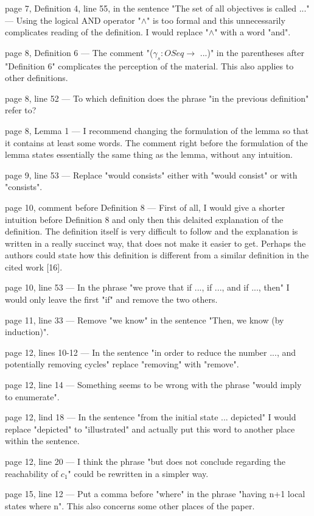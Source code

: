 \documentclass[11pt]{article}
\begin{document}
page 7, Definition 4, line 55, in the sentence "The set of all objectives is called ..." ---
Using the logical AND operator "$\land$" is too formal and this unnecessarily complicates reading of the definition.
I would replace "$\land$" with a word "and".

page 8, Definition 6 ---
The comment "($\gamma_s: OSeq \to$ ...)" in the parentheses after "Definition 6" complicates the perception of the material. This also applies to other definitions.

page 8, line 52 ---
To which definition does the phrase "in the previous definition" refer to?

page 8, Lemma 1 ---
I recommend changing the formulation of the lemma so that it contains at least some words.
The comment right before the formulation of the lemma states essentially the same thing as the lemma, without any intuition.

page 9, line 53 ---
Replace "would consists" either with "would consist" or with "consists".

page 10, comment before Definition 8 ---
First of all, I would give a shorter intuition before Definition 8 and only then this delaited explanation of the definition. The definition itself is very difficult to follow and the explanation is written in a really succinct way, that does not make it easier to get. Perhaps the authors could state how this definition is different from a similar definition in the cited work [16].

page 10, line 53 ---
In the phrase "we prove that if ..., if ..., and if ..., then" I would only leave the first "if" and remove the two others.

page 11, line 33 ---
Remove "we know" in the sentence "Then, we know (by induction)".

page 12, lines 10-12 ---
In the sentence "in order to reduce the number ..., and potentially removing cycles" replace "removing" with "remove".

page 12, line 14 ---
Something seems to be wrong with the phrase "would imply to enumerate".

page 12, lind 18 ---
In the sentence "from the initial state ... depicted" I would replace "depicted" to "illustrated" and actually put this word to another place within the sentence.

page 12, line 20 ---
I think the phrase "but does not conclude regarding the reachability of $c_1$" could be rewritten in a simpler way.

page 15, line 12 ---
Put a comma before "where" in the phrase "having n+1 local states where n".
This also concerns some other places of the paper.
\end{document}
